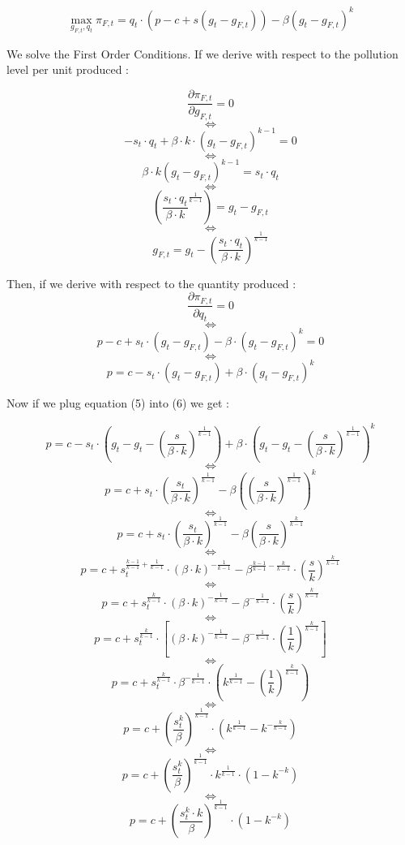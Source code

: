 \documentclass{article}
\begin{document}
$$ \max_{g_{F,t},q_{t}}{\pi_{F,t}=q_{t}\cdot\left(p-c+s(g_{t}-g_{F,t})\right)-\beta(g_{t}-g_{F,t})^{k}}$$

We solve the First Order Conditions. If we derive with respect to the pollution level per unit produced : 

$$\frac{\partial \pi_{F,t}}{\partial g_{F,t}}=0$$
$$\iff$$
$$-s_{t}\cdot q_t+\beta\cdot k\cdot(g_{t}-g_{F,t})^{k-1}=0$$
$$\iff$$
$$\beta\cdot k(g_{t}-g_{F,t})^{k-1}=s_{t}\cdot q_{t}$$
$$\iff$$
$$\left(\frac{s_{t}\cdot q_{t}}{\beta\cdot k}^{\frac{1}{k-1}}\right)=g_{t}-g_{F,t}$$
$$\iff$$
\begin{equation}
    g_{F,t}=g_{t}-\left(\frac{s_{t}\cdot q_{t}}{\beta\cdot k}\right)^{\frac{1}{k-1}}
\end{equation}

Then, if we derive with respect to the quantity produced :
$$\frac{\partial \pi_{F,t}}{\partial q_{t}}=0$$
$$\iff$$
$$p-c+s_{t}\cdot(g_{t}-g_{F,t})-\beta\cdot(g_{t}-g_{F,t})^{k}=0$$
$$\iff$$
\begin{equation}
    p=c-s_{t}\cdot(g_{t}-g_{F,t})+\beta\cdot(g_{t}-g_{F,t})^{k} 
\end{equation}

Now if we plug equation (5) into (6) we get : 

$$ p=c-s_{t}\cdot\left(g_{t}-g_{t}-\left(\frac{s}{\beta\cdot k}\right)^{\frac{1}{k-1}}\right)+\beta\cdot\left(g_{t}-g_{t}-\left(\frac{s}{\beta\cdot k}\right)^{\frac{1}{k-1}}\right)^{k}$$
$$\iff$$
$$p=c+s_{t}\cdot\left(\frac{s_{t}}{\beta\cdot k}\right)^{\frac{1}{k-1}}-\beta\left(\left(\frac{s}{\beta\cdot k}\right)^{\frac{1}{k-1}}\right)^{k}$$
$$\iff$$
$$p=c+s_{t}\cdot\left(\frac{s_{t}}{\beta\cdot k}\right)^{\frac{1}{k-1}}-\beta\left(\frac{s}{\beta\cdot k}\right)^{\frac{k}{k-1}}$$
$$\iff$$
$$p=c+s_{t}^{\frac{k-1}{k-1}+\frac{1}{k-1}}\cdot\left({\beta\cdot k}\right)^{-\frac{1}{k-1}}-\beta^{\frac{k-1}{k-1}-\frac{k}{k-1}}\cdot\left(\frac{s}{k}\right)^{\frac{k}{k-1}}$$
$$\iff$$
$$p=c+s_{t}^{\frac{k}{k-1}}\cdot\left({\beta\cdot k}\right)^{-\frac{1}{k-1}}-\beta^{-\frac{1}{k-1}}\cdot\left(\frac{s}{k}\right)^{\frac{k}{k-1}}$$
$$\iff$$
$$p=c+s_{t}^{\frac{k}{k-1}}\cdot\left[\left({\beta\cdot k}\right)^{-\frac{1}{k-1}}-\beta^{-\frac{1}{k-1}}\cdot\left(\frac{1}{k}\right)^{\frac{k}{k-1}}\right]$$
$$\iff$$
$$p=c+s_{t}^{\frac{k}{k-1}}\cdot{\beta}^{-\frac{1}{k-1}}\cdot\left(k^{\frac{1}{k-1}}-\left(\frac{1}{k}\right)^{\frac{k}{k-1}}\right)$$
$$\iff$$
$$p=c+\left(\frac{s_{t}^k}{\beta}\right)^{\frac{1}{k-1}}\cdot\left(k^{\frac{1}{k-1}}-{k}^{-\frac{k}{k-1}}\right)$$
$$\iff$$
$$p=c+\left(\frac{s_{t}^k}{\beta}\right)^{\frac{1}{k-1}}\cdot{k}^{\frac{1}{k-1}}\cdot\left(1-{k}^{-k}\right)$$
$$\iff$$
\begin{equation}
    p=c+\left(\frac{s_{t}^k\cdot k}{\beta}\right)^{\frac{1}{k-1}}\cdot\left(1-{k}^{-k}\right)
\end{equation}
\end{document}
